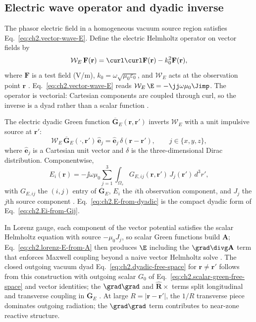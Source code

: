 
\subsection{Electric wave operator and dyadic inverse}
\label{sec:ch02.4.1b}

The phasor electric field in a homogeneous vacuum source region satisfies Eq.~\eqref{eq:ch2.vector-wave-E}. Define the electric Helmholtz operator on vector fields by
\begin{equation}
\label{eq:ch2.electric-wave-operator}
\mathcal{W}_{E}\,\mathbf{F}(\mathbf{r})
=
\curl\curl\mathbf{F}(\mathbf{r})-k_0^2\mathbf{F}(\mathbf{r}),
\end{equation}
where $\mathbf{F}$ is a test field (V/m), $k_0=\omega\sqrt{\mu_0\varepsilon_0}$, and $\mathcal{W}_{E}$ acts at the observation point $\mathbf{r}$ \cite{stratton1941,harrington2001}. Eq.~\eqref{eq:ch2.vector-wave-E} reads $\mathcal{W}_{E}\,\E=-\jj\omega\mu_0\Jimp$. The operator is vectorial: Cartesian components are coupled through curl, so the inverse is a dyad rather than a scalar function \cite{stratton1941}.

The electric dyadic Green function $\overline{\mathbf{G}}_{E}(\mathbf{r},\mathbf{r}')$ inverts $\mathcal{W}_{E}$ with a unit impulsive source at $\mathbf{r}'$:
\begin{equation}
\label{eq:ch2.dyadic-green-defining-operator}
\mathcal{W}_{E}\,\overline{\mathbf{G}}_{E}(\cdot,\mathbf{r}')\,\hat{\mathbf{e}}_j
=
\hat{\mathbf{e}}_j\,\delta(\mathbf{r}-\mathbf{r}'),
\qquad
j\in\{x,y,z\},
\end{equation}
where $\hat{\mathbf{e}}_j$ is a Cartesian unit vector and $\delta$ is the three-dimensional Dirac distribution. Componentwise,
\begin{equation}
\label{eq:ch2.Ei-from-Gij}
E_i(\mathbf{r})
=
-\jj\omega\mu_0\sum_{j=1}^{3}\int_{\Omega_s}
G_{E,ij}(\mathbf{r},\mathbf{r}')\,J_j(\mathbf{r}')\,d^3r',
\end{equation}
with $G_{E,ij}$ the $(i,j)$ entry of $\overline{\mathbf{G}}_{E}$, $E_i$ the $i$th observation component, and $J_j$ the $j$th source component \cite{harrington2001}. Eq.~\eqref{eq:ch2.E-from-dyadic} is the compact dyadic form of Eq.~\eqref{eq:ch2.Ei-from-Gij}.

In Lorenz gauge, each component of the vector potential satisfies the scalar Helmholtz equation with source $-\mu_0 J_j$, so scalar Green functions build $\mathbf{A}$; Eq.~\eqref{eq:ch2.lorenz-E-from-A} then produces $\E$ including the $\grad\divg\mathbf{A}$ term that enforces Maxwell coupling beyond a naive vector Helmholtz solve \cite{stratton1941,jackson1999}. The closed outgoing vacuum dyad Eq.~\eqref{eq:ch2.dyadic-free-space} for $\mathbf{r}\neq\mathbf{r}'$ follows from this construction with outgoing scalar $G_0$ of Eq.~\eqref{eq:ch2.scalar-green-free-space} and vector identities; the $\grad\grad$ and $\hat{\mathbf{R}}\times$ terms split longitudinal and transverse coupling in $\overline{\mathbf{G}}_{E}$ \cite{stratton1941,jackson1999}. At large $R=|\mathbf{r}-\mathbf{r}'|$, the $1/R$ transverse piece dominates outgoing radiation; the $\grad\grad$ term contributes to near-zone reactive structure.

